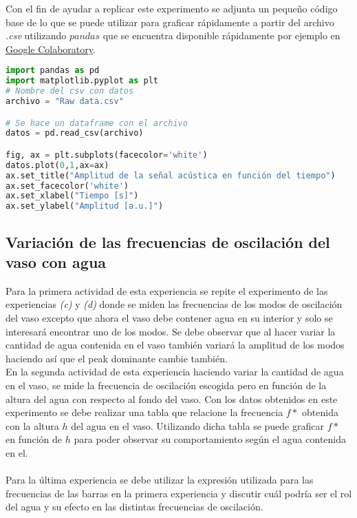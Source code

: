 \documentclass[letterpaper,11pt]{article} %
\begin{document}
Con el fin de ayudar a replicar este experimento se adjunta un pequeño código base de lo que se puede utilizar para graficar rápidamente a partir del archivo \textit{.csv} utilizando $pandas$ que se encuentra disponible rápidamente por ejemplo en \href{https://colab.research.google.com/}{Google Colaboratory}.
\begin{lstlisting}[language=Python]
import pandas as pd
import matplotlib.pyplot as plt
# Nombre del csv con datos
archivo = "Raw data.csv"

# Se hace un dataframe con el archivo
datos = pd.read_csv(archivo)

fig, ax = plt.subplots(facecolor='white')
datos.plot(0,1,ax=ax)
ax.set_title("Amplitud de la señal acústica en función del tiempo")
ax.set_facecolor('white')
ax.set_xlabel("Tiempo [s]")
ax.set_ylabel("Amplitud [a.u.]")

\end{lstlisting}

\subsection{Variación de las frecuencias de oscilación del vaso con agua }

Para la primera actividad de esta experiencia se repite el experimento de las experiencias \textit{(c)} y \textit{(d)} donde se miden las frecuencias de los modos de oscilación del vaso excepto que ahora el vaso debe contener agua en su interior y solo se interesará encontrar uno de los modos. Se debe observar que al hacer variar la cantidad de agua contenida en el vaso también variará la amplitud de los modos haciendo así que el peak dominante cambie también. \\ 

En la segunda actividad de esta experiencia haciendo variar la cantidad de agua en el vaso, se mide la frecuencia de oscilación escogida pero en función de la altura del agua con respecto al fondo del vaso. Con los datos obtenidos en este experimento se debe realizar una tabla que relacione la frecuencia $f*$ obtenida con la altura $h$ del agua en el vaso. Utilizando dicha tabla se puede graficar $f*$ en función de $h$ para poder observar su comportamiento según el agua contenida en el. \\ \\
Para la última experiencia se debe utilizar la expresión utilizada para las frecuencias de las barras en la primera experiencia y discutir cuál podría ser el rol del agua y su efecto en las distintas frecuencias de oscilación.
\end{document}
